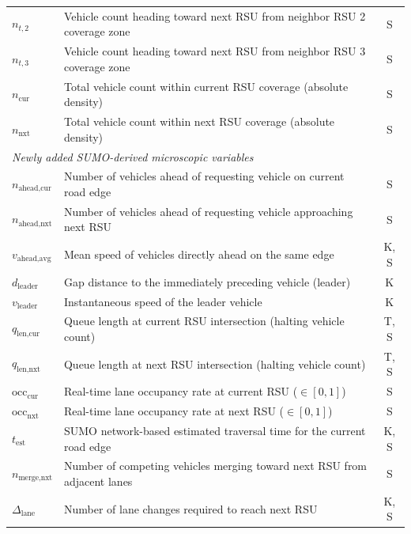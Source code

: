 \documentclass[journal]{IEEEtran}
\begin{document}
\begin{table}[!t]
\begin{tabular}{@{}lp{5.0cm}c@{}}
    $n_{t,2}$                 & Vehicle count heading toward next RSU from neighbor RSU 2 coverage zone      & S \\
    $n_{t,3}$                 & Vehicle count heading toward next RSU from neighbor RSU 3 coverage zone      & S \\
    $n_{\text{cur}}$          & Total vehicle count within current RSU coverage (absolute density)           & S \\
    $n_{\text{nxt}}$          & Total vehicle count within next RSU coverage (absolute density)              & S \\
    \midrule
    \multicolumn{3}{l}{\textit{Newly added SUMO-derived microscopic variables}} \\
    $n_{\text{ahead,cur}}$    & Number of vehicles ahead of requesting vehicle on current road edge          & S \\
    $n_{\text{ahead,nxt}}$    & Number of vehicles ahead of requesting vehicle approaching next RSU          & S \\
    $v_{\text{ahead,avg}}$    & Mean speed of vehicles directly ahead on the same edge                       & K, S \\
    $d_{\text{leader}}$       & Gap distance to the immediately preceding vehicle (leader)                   & K \\
    $v_{\text{leader}}$       & Instantaneous speed of the leader vehicle                                    & K \\
    $q_{\text{len,cur}}$      & Queue length at current RSU intersection (halting vehicle count)             & T, S \\
    $q_{\text{len,nxt}}$      & Queue length at next RSU intersection (halting vehicle count)                & T, S \\
    $\text{occ}_{\text{cur}}$ & Real-time lane occupancy rate at current RSU ($\in [0,1]$)                   & S \\
    $\text{occ}_{\text{nxt}}$ & Real-time lane occupancy rate at next RSU ($\in [0,1]$)                      & S \\
    $t_{\text{est}}$          & SUMO network-based estimated traversal time for the current road edge        & K, S \\
    $n_{\text{merge,nxt}}$    & Number of competing vehicles merging toward next RSU from adjacent lanes     & S \\
    $\Delta_{\text{lane}}$    & Number of lane changes required to reach next RSU                            & K, S \\
    \bottomrule
  \end{tabular}
\end{table}
\end{document}
